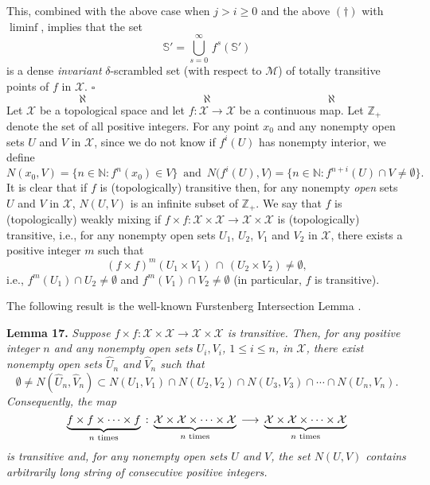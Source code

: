\documentclass[12pt]{article}
\newcommand{\sq}{$\square$}
\begin{document}
\indent This, combined with the above case when $j > i \ge 0$ and the above $(\dagger)$ with $\liminf$, implies that the set 
$$
\widehat {\mathbb S'} = \bigcup_{s=0}^\infty \, f^s(\mathbb S')
$$
is a dense {\it invariant} $\delta$-scrambled set (with respect to $\mathcal M$) of totally transitive points of $f$ in $\mathcal X$.
\hfill\sq
$$\aleph \qquad\qquad\qquad\qquad\qquad \aleph \qquad\qquad\qquad\qquad\qquad \aleph$$
\indent Let $\mathcal X$ be a topological space and let $f : \mathcal X \rightarrow \mathcal X$ be a continuous map.  Let $\mathbb Z_+$ denote the set of all positive integers.  For any point $x_0$ and any nonempty open sets $U$ and $V$ in $\mathcal X$, since we do not know if $f^i(U)$ has nonempty interior, we define 
$$
N(x_0, V) = \{ n \in \mathbb N: f^n(x_0) \in V \} \,\,\, \text{and} \,\,\, N\big(f^i(U), V\big) = \{ n \in \mathbb N: f^{n+i}(U) \cap V \ne \emptyset \}.
$$
It is clear that if $f$ is (topologically) transitive then, for any nonempty {\it open} sets $U$ and $V$ in $\mathcal X$, $N(U, V)$ is an infinite subset of $\mathbb Z_+$.  We say that $f$ is (topologically) weakly mixing {\bf\cite{linear}} if $f \times f: \mathcal X \times \mathcal X \rightarrow \mathcal X \times \mathcal X$ is (topologically) transitive, i.e., for any nonempty open sets $U_1$, $U_2$, $V_1$ and $V_2$ in $\mathcal X$, there exists a positive integer $m$ such that 
$$
(f \times f)^m(U_1 \times V_1) \, \cap \, (U_2 \times V_2) \ne \emptyset,
$$
i.e., $f^m(U_1) \cap U_2 \ne \emptyset$ and $f^m(V_1) \cap V_2 \ne \emptyset$ (in particular, $f$ is transitive).  

The following result is the well-known Furstenberg Intersection Lemma {\bf\cite{fur}}.  

\noindent
{\bf Lemma 17.}
{\it Suppose $f \times f: \mathcal X \times \mathcal X \longrightarrow \mathcal X \times \mathcal X$ is transitive.  Then, for any positive integer $n$ and any nonempty open sets $U_i, V_i$, $1 \le i \le n$, in $\mathcal X$, there exist nonempty open sets $\widehat U_n$ and $\widehat V_n$ such that 
$$
\emptyset \ne N(\widehat U_n, \widehat V_n) \subset N(U_1, V_1) \cap N(U_2, V_2) \cap N(U_3, V_3) \cap \cdots \cap N(U_n, V_n).
$$
Consequently, the map 
$$
\underbrace{f \times f \times \cdots \times f}_{n \,\, \rm{times}} \, : \, \underbrace{\mathcal X \times \mathcal X \times \cdots \times \mathcal X}_{n \,\, \rm{times}} \, \longrightarrow \, \underbrace{\mathcal X \times \mathcal X \times \cdots \times \mathcal X}_{n \,\, \rm{times}}
$$ 
is transitive and, for any nonempty open sets $U$ and $V$, the set $N(U, V)$ contains arbitrarily long string of consecutive positive integers.}
\end{document}
